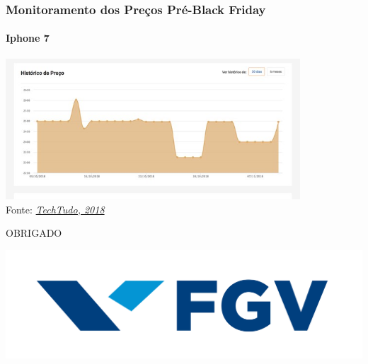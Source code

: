 \documentclass[compress,12pt]{beamer}
\begin{document}
\begin{frame}
    \frametitle{Monitoramento dos Preços Pré-Black Friday}
    \framesubtitle{Iphone 7}
    \centering
    \includegraphics[width=110mm]{Imagens/iphone7.jpeg} \\
    Fonte: \href{https://www.techtudo.com.br/google/amp/noticias/2018/11/black-friday-2018-conheca-golpes-comuns-do-dia-de-descontos-e-proteja-se.ghtml}{\textit{TechTudo, 2018}}
\end{frame}
\End
\begin{frame}
  \centering
  \vfill
  {\fontsize{40}{50}\selectfont OBRIGADO}
  \vfill
  \begin{center}
    \includegraphics[scale=0.03]{Imagens/FGV-Logo.png}
  \end{center}
\end{frame}
\end{document}
